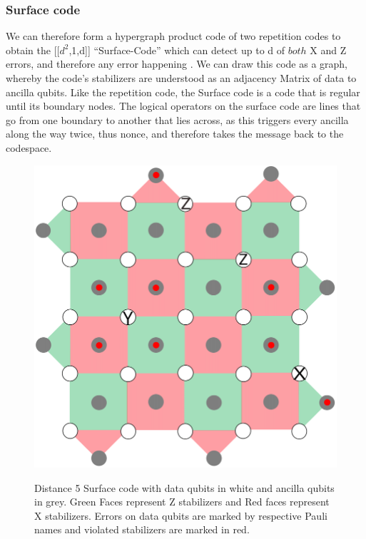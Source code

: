 \subsubsection{Surface code}
We can therefore form a hypergraph product code of two repetition
codes to
obtain the [[$d^2$,1,d]] ``Surface-Code'' which can detect up
to d of $both$ X and Z errors, and 
therefore any error happening \cite{joschka}.
We can draw this code as a graph, whereby the code's stabilizers
are understood as an adjacency Matrix of data to ancilla qubits.
Like the repetition code, the Surface code is a code that is regular until
its boundary nodes. 
The logical operators on the surface code are lines that go from one 
boundary to another that lies across, as this triggers every ancilla along
the way twice, thus nonce, and therefore takes the message back to the
codespace.

\begin{figure}[h!]
	\begin{center}
	\captionsetup{justification=centering,margin=2cm}
	\includegraphics[scale=0.25]{./img/figures/d5surfaceCode.png}\\
	\caption{Distance 5 Surface code with data qubits in white and 
    ancilla qubits in grey. Green Faces represent Z stabilizers
    and Red faces represent X stabilizers.
    Errors on data qubits are marked
    by respective Pauli names and violated stabilizers are marked in red.}
	\label{fig: surface_code}
	\end{center}
\end{figure}
